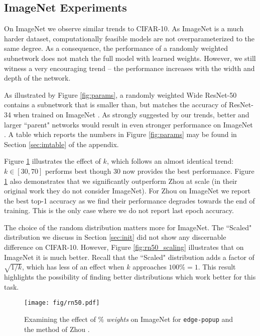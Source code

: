 \documentclass[10pt,twocolumn,letterpaper]{article}
\newcommand{\alg}{\texttt{edge-popup} }
\begin{document}
\subsection{ImageNet \cite{imagenet} Experiments}\label{sec:imagenet}

On ImageNet we observe similar trends to CIFAR-10. As ImageNet is a much harder dataset, computationally feasible models are not overparameterized to the same degree. As a consequence, the performance of a randomly weighted subnetwork does not match the full model with learned weights.
However, we still witness a very encouraging trend -- the performance increases with the width and depth of the network. 

As illustrated by Figure \ref{fig:params}, a randomly weighted Wide ResNet-50 contains a subnetwork that is smaller than, but matches the accuracy of ResNet-34 when trained on ImageNet \cite{imagenet}. As strongly suggested by our trends, better and larger ``parent" networks would result in even stronger performance on ImageNet \cite{imagenet}. A table which reports the numbers in Figure \ref{fig:params} may be found in Section \ref{sec:imtable} of the appendix.

Figure \ref{fig:rn50} illustrates the effect of $k$, which follows an almost identical trend: $k \in [30,70]$ performs best though 30 now provides the best performance. Figure \ref{fig:rn50} also demonstrates that we significantly outperform Zhou \etal at scale (in their original work they do not consider ImageNet). For Zhou \etal on ImageNet we report the best top-1 accuracy as we find their performance degrades towards the end of training. This is the only case where we do not report last epoch accuracy.

The choice of the random distribution matters more for ImageNet. The ``Scaled" distribution we discuss in Section \ref{sec:init} did not show any discernable difference on CIFAR-10. However, Figure \ref{fig:rn50_scaling} illustrates that on ImageNet it is much better. Recall that the ``Scaled"
 distribution adds a factor of $\sqrt{1/k}$, which has less of an effect when $k$ approaches $100 \% = 1$. This result highlights the possibility of finding better distributions which work better for this task.

\begin{figure}[t]
\begin{center}
\texttt{[image: fig/rn50.pdf]}
\end{center}
  \caption{Examining the effect of $\%$ \textit{weights} on ImageNet for \alg and the method of Zhou \etal.}
\label{fig:rn50}
\end{figure}
\end{document}
